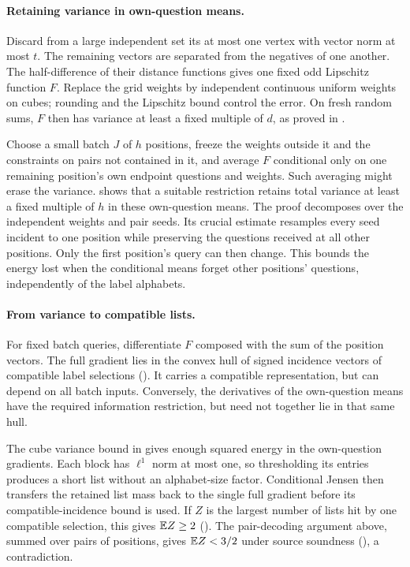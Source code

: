 \paragraph{Retaining variance in own-question means.}
Discard from a large independent set its at most one vertex with
vector norm at most \(t\). The remaining vectors are separated
from the negatives of one another. The half-difference of their
distance functions gives one fixed odd Lipschitz function \(F\).
Replace the grid weights by independent continuous uniform weights
on cubes; rounding and the Lipschitz bound control the error.
On fresh random sums, \(F\) then has variance at least a fixed
multiple of \(d\), as proved in .

Choose a small batch \(J\) of \(h\) positions, freeze the
weights outside it and the constraints on pairs not contained in it,
and average \(F\) conditional only on one remaining position's
own endpoint questions and weights. Such averaging might erase the
variance.  shows that a suitable
restriction retains total variance at least a fixed multiple of
\(h\) in these own-question means. The proof decomposes over the independent weights
and pair seeds. Its crucial estimate resamples every seed incident
to one position while preserving the questions received at all other
positions. Only the first position's query can then change. This
bounds the energy lost when the conditional means forget other
positions' questions, independently of the label alphabets.

\paragraph{From variance to compatible lists.}
For fixed batch queries, differentiate \(F\) composed with the
sum of the position vectors. The full gradient lies in the convex
hull of signed incidence vectors of compatible label selections
(). It carries a compatible representation, but
can depend on all batch inputs. Conversely, the derivatives of the
own-question means have the required information restriction, but
need not together lie in that same hull.

The cube variance bound in  gives enough squared
energy in the own-question gradients. Each block has \(\ell^1\)
norm at most one, so thresholding its entries produces a short list
without an alphabet-size factor. Conditional Jensen then transfers
the retained list mass back to the single full gradient before its
compatible-incidence bound is used. If \(Z\) is the largest
number of lists hit by one compatible selection, this gives
\(\mathbb E Z\geq2\) (). The pair-decoding argument
above, summed over pairs of positions, gives \(\mathbb E Z<3/2\)
under source soundness (), a contradiction.

